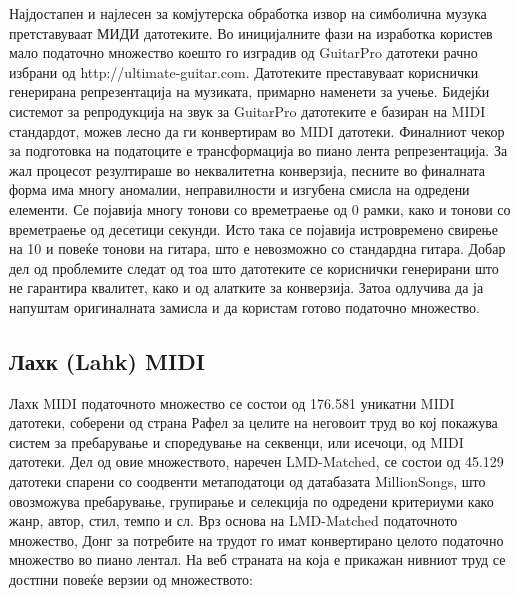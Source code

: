 Најдостапен и најлесен за комјутерска обработка извор на симболична музука претставуваат МИДИ датотеките. Во иницијалните фази на изработка користев мало податочно множество коешто го изградив од GuitarPro датотеки рачно избрани од http://ultimate-guitar.com. Датотеките преставуваат кориснички генерирана репрезентација на музиката, примарно наменети за учење. Бидејќи системот за репродукција на звук за GuitarPro датотеките е базиран на MIDI стандардот, можев лесно да ги конвертирам во MIDI датотеки. Финалниот чекор за подготовка на податоците е трансформација во пиано лента репрезентација. За жал процесот резултираше во неквалитетна конверзија, песните во финалната форма има многу аномалии, неправилности и изгубена смисла на одредени елементи. Се појавија многу тонови со времетраење од 0 рамки, како и тонови со времетраење од десетици секунди. Исто така се појавија истровремено свирење на 10 и повеќе тонови на гитара, што е невозможно со стандардна гитара. Добар дел од проблемите следат од тоа што датотеките се кориснички генерирани што не гарантира квалитет, како и од алатките за конверзија. Затоа одлучива да ја напуштам оригиналната замисла и да користам готово податочно множество.

\subsection{Лахк (Lahk) MIDI}

Лахк MIDI податочното множество се состои од 176.581 уникатни MIDI датотеки, соберени од страна Рафел за целите на неговоит труд \cite{Raffel2016} во кој покажува систем за пребарување и споредување на секвенци, или исечоци, од MIDI датотеки. Дел од овие множеството, наречен LMD-Matched, се состои од 45.129 датотеки спарени со соодвенти метаподатоци од датабазата MillionSongs, што овозможува пребарување, групирање и селекција по одредени критериуми како жанр, автор, стил, темпо и сл. 
Врз основа на LMD-Matched податочното множество, Донг за потребите на трудот \cite{Dong2017} го имат конвертирано целото податочно множество во пиано лентал. На веб страната на која е прикажан нивниот труд се достпни повеќе верзии од множеството:

